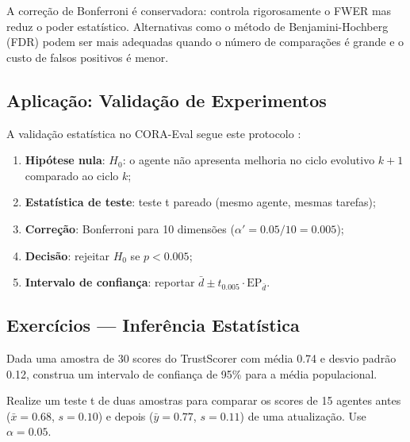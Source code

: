 \begin{observacao}
    A correção de Bonferroni é conservadora: controla rigorosamente o FWER
    mas reduz o poder estatístico. Alternativas como o método de
    Benjamini-Hochberg (FDR) podem ser mais adequadas quando o número de
    comparações é grande e o custo de falsos positivos é menor.
\end{observacao}

\subsection{Aplicação: Validação de Experimentos}

A validação estatística no CORA-Eval segue este protocolo
\cite{laranjeira2026cora, laranjeira2026opencode}:
\begin{enumerate}
    \item \textbf{Hipótese nula}: $H_0$: o agente não apresenta melhoria no
          ciclo evolutivo $k+1$ comparado ao ciclo $k$;
    \item \textbf{Estatística de teste}: teste t pareado (mesmo agente,
          mesmas tarefas);
    \item \textbf{Correção}: Bonferroni para 10 dimensões
          ($\alpha' = 0.05 / 10 = 0.005$);
    \item \textbf{Decisão}: rejeitar $H_0$ se $p < 0.005$;
    \item \textbf{Intervalo de confiança}: reportar $\bar{d} \pm t_{0.005}
          \cdot \text{EP}_{\bar{d}}$.
\end{enumerate}

\subsection{Exercícios — Inferência Estatística}

\begin{exercicio}
    Dada uma amostra de 30 scores do TrustScorer com média 0.74 e desvio
    padrão 0.12, construa um intervalo de confiança de 95\% para a média
    populacional.
\end{exercicio}

\begin{exercicio}
    Realize um teste t de duas amostras para comparar os scores de 15
    agentes antes ($\bar{x} = 0.68$, $s = 0.10$) e depois ($\bar{y} = 0.77$,
    $s = 0.11$) de uma atualização. Use $\alpha = 0.05$.
\end{exercicio}

